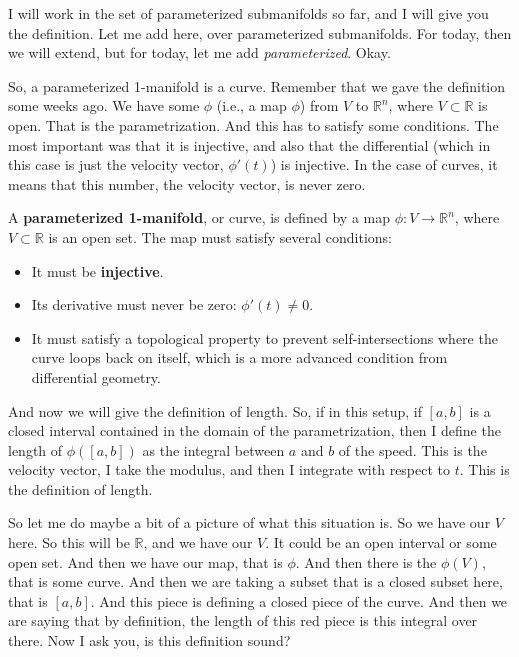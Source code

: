 \begin{spoken-clean}[04:30 - 06:25]
I will work in the set of parameterized submanifolds so far, and I will give you the definition. Let me add here, over parameterized submanifolds. For today, then we will extend, but for today, let me add \emph{parameterized}. Okay.

So, a parameterized 1-manifold is a curve. Remember that we gave the definition some weeks ago. We have some $\phi$ (i.e., a map $\phi$) from $V$ to $\mathbb{R}^n$, where $V \subset \mathbb{R}$ is open. That is the parametrization. And this has to satisfy some conditions. The most important was that it is injective, and also that the differential (which in this case is just the velocity vector, $\phi'(t)$) is injective. In the case of curves, it means that this number, the velocity vector, is never zero.
\end{spoken-clean}

\begin{math-stroke}
A \textbf{parameterized 1-manifold}, or curve, is defined by a map $\phi: V \to \mathbb{R}^n$, where $V \subset \mathbb{R}$ is an open set. The map must satisfy several conditions:
\begin{itemize}
    \item It must be \textbf{injective}.
    \item Its derivative must never be zero: $\phi'(t) \neq 0$.
    \item It must satisfy a topological property to prevent self-intersections where the curve loops back on itself, which is a more advanced condition from differential geometry.
\end{itemize}
\end{math-stroke}

\begin{spoken-clean}[06:25 - 08:38]
And now we will give the definition of length. So, if in this setup, if $[a,b]$ is a closed interval contained in the domain of the parametrization, then I define the length of $\phi([a,b])$ as the integral between $a$ and $b$ of the speed. This is the velocity vector, I take the modulus, and then I integrate with respect to $t$. This is the definition of length.

So let me do maybe a bit of a picture of what this situation is. So we have our $V$ here. So this will be $\mathbb{R}$, and we have our $V$. It could be an open interval or some open set. And then we have our map, that is $\phi$. And then there is the $\phi(V)$, that is some curve. And then we are taking a subset that is a closed subset here, that is $[a,b]$. And this piece is defining a closed piece of the curve. And then we are saying that by definition, the length of this red piece is this integral over there. Now I ask you, is this definition sound?
\end{spoken-clean}

